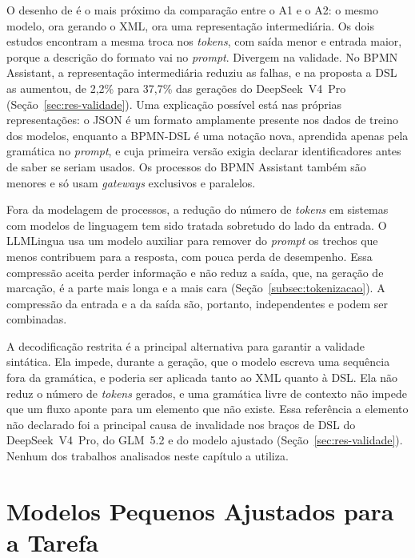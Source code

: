 O desenho de  é o mais próximo da comparação entre o A1 e o A2: o mesmo modelo, ora gerando o XML, ora uma representação intermediária. Os dois estudos encontram a mesma troca nos \textit{tokens}, com saída menor e entrada maior, porque a descrição do formato vai no \textit{prompt}. Divergem na validade. No BPMN Assistant, a representação intermediária reduziu as falhas, e na proposta a DSL as aumentou, de 2,2\% para 37,7\% das gerações do DeepSeek~V4~Pro (Seção~\ref{sec:res-validade}). Uma explicação possível está nas próprias representações: o JSON é um formato amplamente presente nos dados de treino dos modelos, enquanto a BPMN-DSL é uma notação nova, aprendida apenas pela gramática no \textit{prompt}, e cuja primeira versão exigia declarar identificadores antes de saber se seriam usados. Os processos do BPMN Assistant também são menores e só usam \textit{gateways} exclusivos e paralelos.

Fora da modelagem de processos, a redução do número de \textit{tokens} em sistemas com modelos de linguagem tem sido tratada sobretudo do lado da entrada. O LLMLingua \cite{jiang2023llmlingua} usa um modelo auxiliar para remover do \textit{prompt} os trechos que menos contribuem para a resposta, com pouca perda de desempenho. Essa compressão aceita perder informação e não reduz a saída, que, na geração de marcação, é a parte mais longa e a mais cara (Seção~\ref{subsec:tokenizacao}). A compressão da entrada e a da saída são, portanto, independentes e podem ser combinadas.

A decodificação restrita \cite{poesia2022synchromesh} é a principal alternativa para garantir a validade sintática. Ela impede, durante a geração, que o modelo escreva uma sequência fora da gramática, e poderia ser aplicada tanto ao XML quanto à DSL. Ela não reduz o número de \textit{tokens} gerados, e uma gramática livre de contexto não impede que um fluxo aponte para um elemento que não existe. Essa referência a elemento não declarado foi a principal causa de invalidade nos braços de DSL do DeepSeek~V4~Pro, do GLM~5.2 e do modelo ajustado (Seção~\ref{sec:res-validade}). Nenhum dos trabalhos analisados neste capítulo a utiliza.

\section{Modelos Pequenos Ajustados para a Tarefa}
\label{sec:tr-slm}

